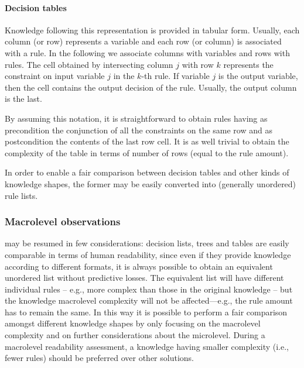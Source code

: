 \documentclass[sigconf]{acmart}
\begin{document}
\paragraph{Decision tables}

Knowledge following this representation is provided in tabular form.
%
Usually, each column (or row) represents a variable and each row (or column) is associated with a rule.
%
In the following we associate columns with variables and rows with rules.
%
The cell obtained by intersecting column $j$ with row $k$ represents the constraint on input variable $j$ in the $k$-th rule.
%
If variable $j$ is the output variable, then the cell contains the output decision of the rule.
%
Usually, the output column is the last.

By assuming this notation, it is straightforward to obtain rules having as precondition the conjunction of all the constraints on the same row and as postcondition the contents of the last row cell.
%
It is as well trivial to obtain the complexity of the table in terms of number of rows (equal to the rule amount).

In order to enable a fair comparison between decision tables and other kinds of knowledge shapes, the former may be easily converted into (generally unordered) rule lists.

\subsubsection{Macrolevel observations}

 may be resumed in few considerations: decision lists, trees and tables are easily comparable in terms of human readability, since even if they provide knowledge according to different formats, it is always possible to obtain an equivalent unordered list without predictive losses.
%
The equivalent list will have different individual rules -- e.g., more complex than those in the original knowledge -- but the knowledge macrolevel complexity will not be affected---e.g., the rule amount has to remain the same.
%
In this way it is possible to perform a fair comparison amongst different knowledge shapes by only focusing on the macrolevel complexity and on further considerations about the microlevel.
%
During a macrolevel readability assessment, a knowledge having smaller complexity (i.e., fewer rules) should be preferred over other solutions.
\end{document}
